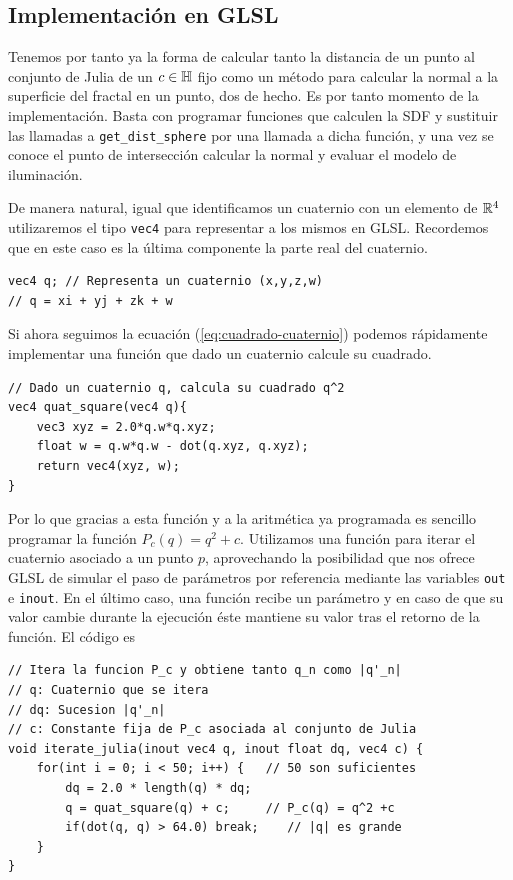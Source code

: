 \subsection{Implementación en GLSL}

Tenemos por tanto ya la forma de calcular tanto la distancia de un punto al conjunto de Julia de un $c\in\mathbb{H}$ fijo como un método para calcular la normal a la superficie del fractal en un punto, dos de hecho. Es por tanto momento de la implementación. Basta con programar funciones que calculen la SDF y sustituir las llamadas a \verb|get_dist_sphere| por una llamada a dicha función, y una vez se conoce el punto de intersección calcular la normal y evaluar el modelo de iluminación.

De manera natural, igual que identificamos un cuaternio con un elemento de $\mathbb{R}^4$ utilizaremos el tipo \verb|vec4| para representar a los mismos en GLSL. Recordemos que en este caso es la última componente la parte real del cuaternio.

\begin{lstlisting}
vec4 q; // Representa un cuaternio (x,y,z,w)
// q = xi + yj + zk + w
\end{lstlisting}

Si ahora seguimos la ecuación (\ref{eq:cuadrado-cuaternio}) podemos rápidamente implementar una función que dado un cuaternio calcule su cuadrado.

\begin{lstlisting}
// Dado un cuaternio q, calcula su cuadrado q^2
vec4 quat_square(vec4 q){
    vec3 xyz = 2.0*q.w*q.xyz;
    float w = q.w*q.w - dot(q.xyz, q.xyz);
    return vec4(xyz, w);
}
\end{lstlisting}

Por lo que gracias a esta función y a la aritmética ya programada es sencillo programar la función $P_c(q)=q^2+c$. Utilizamos una función para iterar el cuaternio asociado a un punto $p$, aprovechando la posibilidad que nos ofrece GLSL de simular el paso de parámetros por referencia mediante las variables \verb|out| e \verb|inout|. En el último caso, una función recibe un parámetro y en caso de que su valor cambie durante la ejecución éste mantiene su valor tras el retorno de la función. El código es 
\begin{lstlisting}
// Itera la funcion P_c y obtiene tanto q_n como |q'_n|
// q: Cuaternio que se itera
// dq: Sucesion |q'_n|
// c: Constante fija de P_c asociada al conjunto de Julia
void iterate_julia(inout vec4 q, inout float dq, vec4 c) {
    for(int i = 0; i < 50; i++) {   // 50 son suficientes
        dq = 2.0 * length(q) * dq;
        q = quat_square(q) + c;     // P_c(q) = q^2 +c
        if(dot(q, q) > 64.0) break;    // |q| es grande
    }
}
\end{lstlisting}

